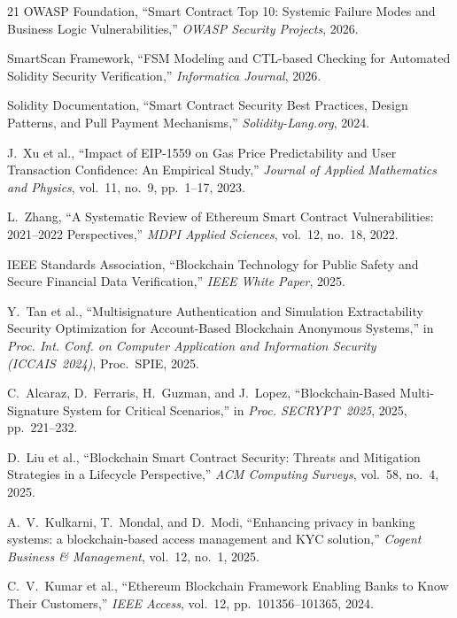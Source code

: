 \documentclass[conference]{IEEEtran}
\begin{document}
\begin{thebibliography}{21}
OWASP Foundation,
``Smart Contract Top 10: Systemic Failure Modes and Business Logic
Vulnerabilities,''
\textit{OWASP Security Projects}, 2026.

SmartScan Framework,
``FSM Modeling and CTL-based Checking for Automated Solidity Security
Verification,''
\textit{Informatica Journal}, 2026.

Solidity Documentation,
``Smart Contract Security Best Practices, Design Patterns, and Pull Payment
Mechanisms,''
\textit{Solidity-Lang.org}, 2024.

J.~Xu et al.,
``Impact of EIP-1559 on Gas Price Predictability and User Transaction
Confidence: An Empirical Study,''
\textit{Journal of Applied Mathematics and Physics}, vol.~11, no.~9,
pp.~1--17, 2023.

L.~Zhang,
``A Systematic Review of Ethereum Smart Contract Vulnerabilities: 2021--2022
Perspectives,''
\textit{MDPI Applied Sciences}, vol.~12, no.~18, 2022.

IEEE Standards Association,
``Blockchain Technology for Public Safety and Secure Financial Data
Verification,''
\textit{IEEE White Paper}, 2025.

Y.~Tan et al.,
``Multisignature Authentication and Simulation Extractability Security
Optimization for Account-Based Blockchain Anonymous Systems,''
in \textit{Proc. Int. Conf. on Computer Application and Information Security
(ICCAIS~2024)}, Proc.~SPIE, 2025.

C.~Alcaraz, D.~Ferraris, H.~Guzman, and J.~Lopez,
``Blockchain-Based Multi-Signature System for Critical Scenarios,''
in \textit{Proc. SECRYPT~2025}, 2025, pp.~221--232.

D.~Liu et al.,
``Blockchain Smart Contract Security: Threats and Mitigation Strategies in a
Lifecycle Perspective,''
\textit{ACM Computing Surveys}, vol.~58, no.~4, 2025.

A.~V.~Kulkarni, T.~Mondal, and D.~Modi,
``Enhancing privacy in banking systems: a blockchain-based access management
and KYC solution,''
\textit{Cogent Business \& Management}, vol.~12, no.~1, 2025.

C.~V.~Kumar et al.,
``Ethereum Blockchain Framework Enabling Banks to Know Their Customers,''
\textit{IEEE Access}, vol.~12, pp.~101356--101365, 2024.

\end{thebibliography}
\end{document}
